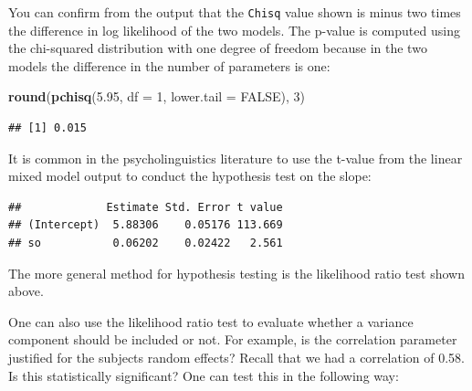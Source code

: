 \documentclass[12pt,]{krantz}
\newenvironment{Shaded}{\begin{snugshade}}{\end{snugshade}}
\newcommand{\DataTypeTok}[1]{\textcolor[rgb]{0.13,0.29,0.53}{#1}}
\newcommand{\DecValTok}[1]{\textcolor[rgb]{0.00,0.00,0.81}{#1}}
\newcommand{\FloatTok}[1]{\textcolor[rgb]{0.00,0.00,0.81}{#1}}
\newcommand{\KeywordTok}[1]{\textcolor[rgb]{0.13,0.29,0.53}{\textbf{#1}}}
\newcommand{\NormalTok}[1]{#1}
\newcommand{\OperatorTok}[1]{\textcolor[rgb]{0.81,0.36,0.00}{\textbf{#1}}}
\newcommand{\OtherTok}[1]{\textcolor[rgb]{0.56,0.35,0.01}{#1}}
\begin{document}
You can confirm from the output that the \texttt{Chisq} value shown is minus two times the difference in log likelihood of the two models. The p-value is computed using the chi-squared distribution with one degree of freedom because in the two models the difference in the number of parameters is one:

\begin{Shaded}
\begin{Highlighting}[]
\KeywordTok{round}\NormalTok{(}\KeywordTok{pchisq}\NormalTok{(}\FloatTok{5.95}\NormalTok{, }\DataTypeTok{df =} \DecValTok{1}\NormalTok{, }\DataTypeTok{lower.tail =} \OtherTok{FALSE}\NormalTok{), }
  \DecValTok{3}\NormalTok{)}
\end{Highlighting}
\end{Shaded}

\begin{verbatim}
## [1] 0.015
\end{verbatim}

It is common in the psycholinguistics literature to use the t-value from the linear mixed model output to conduct the hypothesis test on the slope:

\begin{Shaded}
\end{Shaded}

\begin{verbatim}
##             Estimate Std. Error t value
## (Intercept)  5.88306    0.05176 113.669
## so           0.06202    0.02422   2.561
\end{verbatim}

The more general method for hypothesis testing is the likelihood ratio test shown above.

One can also use the likelihood ratio test to evaluate whether a variance component should be included or not. For example, is the correlation parameter justified for the subjects random effects? Recall that we had a correlation of 0.58. Is this statistically significant? One can test this in the following way:
\end{document}
